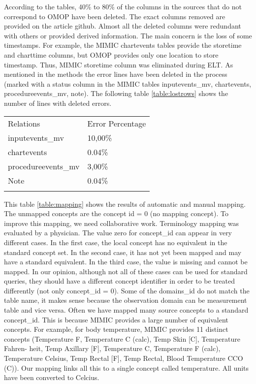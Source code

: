 According to the tables, 40\% to 80\% of the columns in the sources that do not 
correspond to OMOP have been deleted. The exact columns removed are provided 
on the article github. Almost all the deleted columns were redundant with others 
or provided derived information. The main concern is the loss of some timestamps. 
For example, the MIMIC chartevents tables provide the storetime and charttime columns, 
but OMOP provides only one location to store timestamp. Thus, MIMIC storetime 
column was eliminated during ELT. As mentioned in the methods the error lines 
have been deleted in the process (marked with a status column in the MIMIC tables 
inputevents\_mv, chartevents, procedureevents\_mv, note).
The following table \ref{table:lostrows} shows the number of lines with deleted 
errors.

\begin{table*}[t]
\caption{Row level Data lost}{
\begin{tabular}{@{}ll@{}}\toprule
Relations           & Error Percentage \\\colrule
inputevents\_mv     & 10,00\%          \\
chartevents         & 0.04\%           \\
procedureevents\_mv & 3,00\%           \\
Note                & 0.04\%           \\\botrule
\end{tabular}}
\label{table:lostrows}
\end{table*}


This table \ref{table:mapping} shows the results of automatic and manual mapping. 
The unmapped concepts are the concept id = 0 (no mapping concept). 
To improve this mapping, we need collaborative work. Terminology mapping was 
evaluated by a physician. The value zero for concept\_id can appear in very 
different cases. In the first case, the local concept has no equivalent in the 
standard concept set. In the second case, it has not yet been mapped and may 
have a standard equivalent. In the third case, the value is missing and cannot 
be mapped. In our opinion, although not all of these cases can be used for 
standard queries, they should have a different concept identifier in order to be 
treated differently (not only concept\_id = 0). Some of the domains\_id do not 
match the table name, it makes sense because the observation domain can be 
measurement table and vice versa.
Often we have mapped many source concepts to a standard concept\_id. This is 
because MIMIC provides a large number of equivalent concepts. For example, 
for body temperature, MIMIC provides 11 distinct concepts (Temperature F, 
Temperature C (calc), Temp Skin [C], Temperature Fahren- heit, Temp Axillary [F], 
Temperature C, Temperature F (calc), Temperature Celsius, Temp Rectal [F], 
Temp Rectal, Blood Temperature CCO (C)). Our mapping links all this to a single 
concept called temperature. All units have been converted to Celcius.

